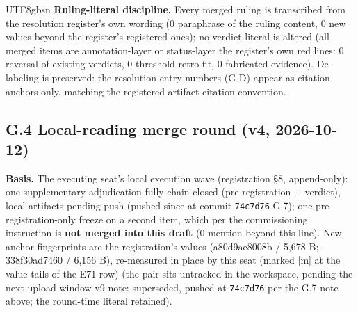 \documentclass[11pt,letterpaper]{article}
\begin{document}
\begin{CJK}{UTF8}{gbsn}
\textbf{Ruling-literal discipline.} Every merged ruling is transcribed from the resolution register's own wording (0 paraphrase of the ruling content, 0 new values beyond the register's registered ones); no verdict literal is altered (all merged items are annotation-layer or status-layer \textemdash{} the register's own red lines: 0 reversal of existing verdicts, 0 threshold retro-fit, 0 fabricated evidence). De-labeling is preserved: the resolution entry numbers (G-D\textellipsis{}) appear as citation anchors only, matching the registered-artifact citation convention.

\subsection*{G.4 Local-reading merge round (v4, 2026-10-12)}

\textbf{Basis.} The executing seat's local execution wave (registration \S{}8, append-only): one supplementary adjudication fully chain-closed (pre-registration + verdict), local artifacts pending push (pushed since at commit \texttt{74c7d76} \textemdash{} G.7); one pre-registration-only freeze on a second item, which per the commissioning instruction is \textbf{not merged into this draft} (0 mention beyond this line). New-anchor fingerprints are the registration's values (a80d9ae8008b / 5,678 B; 338f30ad7460 / 6,156 B), re-measured in place by this seat (marked [m] at the value tails of the E71 row) (the pair sits untracked in the workspace, pending the next upload window \textemdash{} v9 note: superseded, pushed at \texttt{74c7d76} per the G.7 note above; the round-time literal retained).


\end{CJK}
\end{document}
